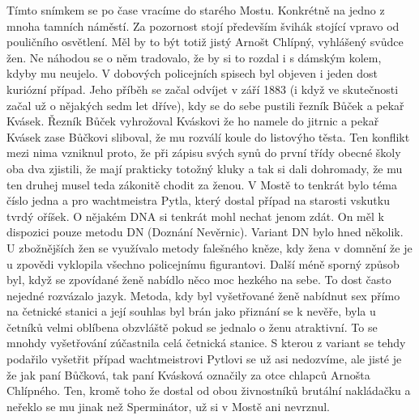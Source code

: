 
Tímto snímkem se po čase vracíme do starého Mostu. Konkrétně na jedno
z mnoha tamních náměstí. Za pozornost stojí především švihák stojící
vpravo od pouličního osvětlení. Měl by to být totiž jistý Arnošt
Chlípný, vyhlášený svůdce žen. Ne náhodou se o něm tradovalo, že by si
to rozdal i s dámským kolem, kdyby mu neujelo. V dobových policejních
spisech byl objeven i jeden dost kuriózní případ. Jeho příběh se začal
odvíjet v září 1883 (i když ve skutečnosti začal už o nějakých sedm let
dříve), kdy se do sebe pustili řezník Bůček a pekař Kvásek. Řezník
Bůček vyhrožoval Kváskovi že ho namele do jitrnic a pekař Kvásek zase
Bůčkovi sliboval, že mu rozválí koule do listovýho těsta. Ten konflikt
mezi nima vzniknul proto, že při zápisu svých synů do první třídy
obecné školy oba dva zjistili, že mají prakticky totožný kluky a tak
si dali dohromady, že mu ten druhej musel teda zákonitě chodit za
ženou. V Mostě to tenkrát bylo téma číslo jedna a pro wachtmeistra
Pytla, který dostal případ na starosti vskutku tvrdý oříšek. O nějakém
DNA si tenkrát mohl nechat jenom zdát. On měl k dispozici pouze metodu
DN (Doznání Nevěrnic). Variant DN bylo hned několik. U zbožnějších žen
se využívalo metody falešného kněze, kdy žena v domnění že je u
zpovědi vyklopila všechno policejnímu figurantovi. Další méně sporný
způsob byl, když se zpovídané ženě nabídlo něco moc hezkého na sebe.
To dost často nejedné rozvázalo jazyk. Metoda, kdy byl vyšetřované
ženě nabídnut sex přímo na četnické stanici a její souhlas byl brán
jako přiznání se k nevěře, byla u četníků velmi oblíbena obzvláště
pokud se jednalo o ženu atraktivní. To se mnohdy vyšetřování
zúčastnila celá četnická stanice. S kterou z variant se tehdy podařilo
vyšetřit případ wachtmeistrovi Pytlovi se už asi nedozvíme, ale jisté
je že jak paní Bůčková, tak paní Kvásková označily za otce chlapců
Arnošta Chlípného. Ten, kromě toho že dostal od obou živnostníků
brutální nakládačku a neřeklo se mu jinak než Sperminátor, už si v
Mostě ani nevrznul.

